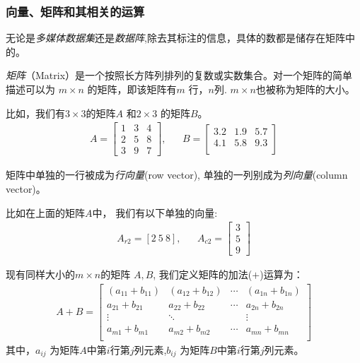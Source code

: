 \documentclass[12pt]{article}
\numberwithin{equation}{section}
\numberwithin{figure}{section}
\begin{document}
\subsubsection{向量、矩阵和其相关的运算}

无论是\textit{多媒体数据集}还是\textit{数据阵},除去其标注的信息，具体的数都是储存在矩阵中的。

\begin{definition}
	\textit{矩阵}（Matrix）是一个按照长方阵列排列的复数或实数集合。对一个矩阵的简单描述可以为 $m \times n$ 的矩阵，即该矩阵有$m$ 行，$n$列. $m \times n$也被称为矩阵的大小。
\end{definition}
\begin{example}
比如，我们有$3 \times 3 $的矩阵$A$ 和$2 \times 3$ 的矩阵$B$。
\begin{align*}
	 A = \begin{bmatrix}
	1 & 3 & 4 \\
	2 & 5 & 8 \\
	3 & 9 & 7
\end{bmatrix}, & & B = \begin{bmatrix}
	3.2 & 1.9 & 5.7 \\
	4.1 & 5.8 & 9.3 \\
\end{bmatrix}
\end{align*}	
\end{example}

\begin{definition}
	矩阵中单独的一行被成为\textit{行向量}(row vector), 单独的一列别成为\textit{列向量}(column vector)。
\end{definition}
\begin{example}
比如在上面的矩阵$A$中，	我们有以下单独的向量:
\begin{align*}
	A_{r2} = [2 \ 5 \ 8],  & & A_{c2} = \begin{bmatrix}
		3 \\
		5 \\
		9 
	\end{bmatrix}
\end{align*}
\end{example}

\begin{definition}
	现有同样大小的$m \times n$的矩阵 $A, B$, 我们定义矩阵的加法($+$)运算为：
	\begin{align*}
		A + B = \begin{bmatrix}
			(a_{11} + b_{11}) & (a_{12}+b_{12}) & \cdots & (a_{1n}+b_{1n}) \\
			a_{21} + b_{21} & a_{22}+b_{22} & \cdots & a_{2n}+b_{2n} \\
			\vdots & \ddots & & \vdots \\
			a_{m1} + b_{m1} & a_{m2}+b_{m2} & \cdots & a_{mn}+b_{mn} \\
		\end{bmatrix}
	\end{align*}
	其中，$a_{ij}$ 为矩阵$A$中第$i$行第$j$列元素,$b_{ij}$ 为矩阵$B$中第$i$行第$j$列元素。
\end{definition}
\end{document}
